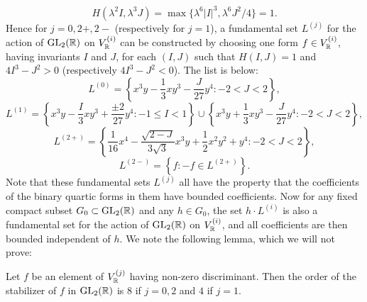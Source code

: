 \documentclass[12pt,amsfont]{amsart}
\begin{document}
\[H(\lambda^2 I, \lambda^3 J) = \max\{\lambda^6 |I|^3, \lambda^6 J^2/4\} = 1.\]
Hence for $j = 0, 2 +, 2-$ (respectively for $j = 1$), a fundamental set $L^{(j)}$ for the action of $\operatorname{GL}_2({\mathbb R})$ on $V_{\mathbb R}^{(i)}$ can be constructed by choosing one form $f \in V_{\mathbb R}^{(i)}$, having invariants $I$ and $J$, for each $(I,J)$ such that $H(I,J) = 1$ and $4I^3 - J^2 > 0$ (respectively $4I^3 - J^2 < 0$). 	The list is below:
\[L^{(0)} = \left \{x^3 y - \frac{1}{3} xy^3 - \frac{J}{27} y^4: -2 < J < 2 \right\},\]
\[L^{(1)} = \left \{x^3 y - \frac{I}{3} xy^3 + \frac{\pm 2}{27} y^4 : -1 \leq I < 1\right\} \cup \left\{x^3 y + \frac{1}{3}xy^3 - \frac{J}{27}y^4 : -2 < J < 2\right\},\]
\[L^{(2+)} = \left\{ \frac{1}{16}x^4 - \frac{\sqrt{2-J}}{3\sqrt{3}} x^3 y + \frac{1}{2} x^2 y^2 + y^4 : -2 < J < 2 \right\},\]
\[L^{(2-)} = \left\{f : -f \in L^{(2+)}\right\}.\]
Note that these fundamental sets $L^{(j)}$ all have the property that the coefficients of the binary quartic forms in them have bounded coefficients. Now for any fixed compact subset $G_0 \subset \operatorname{GL}_2({\mathbb R})$ and any $h \in G_0$, the set $h \cdot L^{(i)}$ is also a fundamental set for the action of $\operatorname{GL}_2({\mathbb R})$ on $V_{\mathbb R}^{(i)}$, and all coefficients are then bounded independent of $h$. We note the following lemma, which we will not prove:

\begin{lem} \label{3L1} Let $f$ be an element of $V_{\mathbb R}^{(j)}$ having non-zero discriminant. Then the order of the stabilizer of $f$ in $\operatorname{GL}_2({\mathbb R})$ is $8$ if $ j = 0, 2$ and $4$ if $j = 1$.
\end{lem} 
\end{document}
